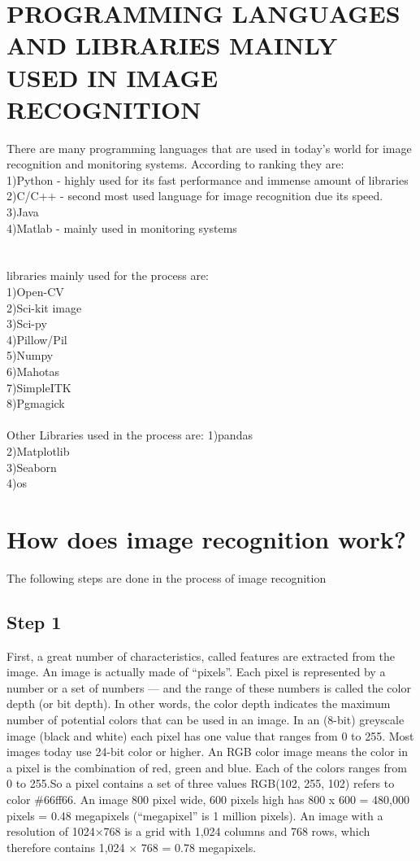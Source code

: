 \documentclass[12pt,letterpaper, onecolumn]{exam}
\begin{document}
  \section{PROGRAMMING LANGUAGES AND LIBRARIES MAINLY USED IN IMAGE RECOGNITION}
  There are many programming languages that are used in today's world for image recognition and monitoring systems. According to ranking they are:\\
  1)Python - highly used for its fast performance and immense amount of libraries\\
  2)C/C++ - second most used language for image recognition due its speed.\\
  3)Java \\
  4)Matlab - mainly used in monitoring systems\\
  \\\\
  libraries mainly used for the process are:\\
  1)Open-CV\\
  2)Sci-kit image\\
  3)Sci-py\\
  4)Pillow/Pil\\
  5)Numpy\\
  6)Mahotas\\
  7)SimpleITK\\
  8)Pgmagick\\
  \\
  Other Libraries used in the process are:
  1)pandas\\
  2)Matplotlib\\
  3)Seaborn\\
  4)os
  
  \section{How does image recognition work?}
    The following steps are done in the process of image recognition
    \subsection{Step 1}
        First, a great number of characteristics, called features are extracted from the image. An image is actually made of “pixels”.
        Each pixel is represented by a number or a set of numbers — and the range of these numbers is called the color depth (or bit depth). In other words, the color depth indicates the maximum number of potential colors that can be used in an image. In an (8-bit) greyscale image (black and white) each pixel has one value that ranges from 0 to 255. Most images today use 24-bit color or higher. An RGB color image means the color in a pixel is the combination of red, green and blue. Each of the colors ranges from 0 to 255.So a pixel contains a set of three values RGB(102, 255, 102) refers to color \#66ff66. An image 800 pixel wide, 600 pixels high has 800 x 600 = 480,000 pixels = 0.48 megapixels (“megapixel” is 1 million pixels). An image with a resolution of 1024×768 is a grid with 1,024 columns and 768 rows, which therefore contains 1,024 × 768 = 0.78 megapixels.
\end{document}
